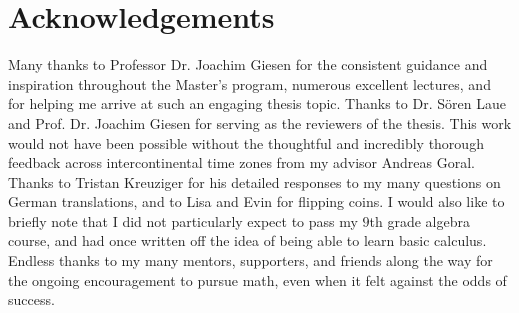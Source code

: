 \section*{Acknowledgements}

\null \quad \quad Many thanks to Professor Dr. Joachim Giesen for the consistent guidance and inspiration throughout the Master's program, numerous excellent lectures, and for helping me arrive at such an engaging thesis topic. Thanks to Dr. S\"{o}ren Laue and Prof. Dr. Joachim Giesen for serving as the reviewers of the thesis. \newline
\null \quad \quad This work would not have been possible without the thoughtful and incredibly thorough feedback across intercontinental time zones from my advisor Andreas Goral.\newline 
\null \quad \quad Thanks to Tristan Kreuziger for his detailed responses to my many questions on German translations, and to Lisa and Evin for flipping coins. \newline
\null \quad \quad I would also like to briefly note that I did not particularly expect to pass my $9$th grade algebra course, and had once written off the idea of being able to learn basic calculus. Endless thanks to my many mentors, supporters, and friends along the way for the ongoing encouragement to pursue math, even when it felt against the odds of success. \newline 
